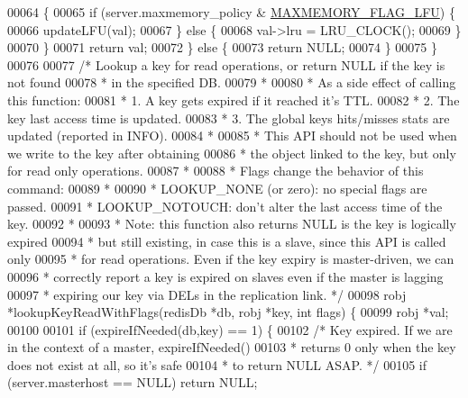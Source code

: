 \begin{DoxyCode}
00064         \{
00065             \textcolor{keywordflow}{if} (server.maxmemory\_policy & \hyperlink{server_8h_aac2d3ad7a604f87e06e25233dbd01c9b}{MAXMEMORY\_FLAG\_LFU}) \{
00066                 updateLFU(val);
00067             \} \textcolor{keywordflow}{else} \{
00068                 val->lru = LRU\_CLOCK();
00069             \}
00070         \}
00071         \textcolor{keywordflow}{return} val;
00072     \} \textcolor{keywordflow}{else} \{
00073         \textcolor{keywordflow}{return} NULL;
00074     \}
00075 \}
00076 
00077 \textcolor{comment}{/* Lookup a key for read operations, or return NULL if the key is not found}
00078 \textcolor{comment}{ * in the specified DB.}
00079 \textcolor{comment}{ *}
00080 \textcolor{comment}{ * As a side effect of calling this function:}
00081 \textcolor{comment}{ * 1. A key gets expired if it reached it's TTL.}
00082 \textcolor{comment}{ * 2. The key last access time is updated.}
00083 \textcolor{comment}{ * 3. The global keys hits/misses stats are updated (reported in INFO).}
00084 \textcolor{comment}{ *}
00085 \textcolor{comment}{ * This API should not be used when we write to the key after obtaining}
00086 \textcolor{comment}{ * the object linked to the key, but only for read only operations.}
00087 \textcolor{comment}{ *}
00088 \textcolor{comment}{ * Flags change the behavior of this command:}
00089 \textcolor{comment}{ *}
00090 \textcolor{comment}{ *  LOOKUP\_NONE (or zero): no special flags are passed.}
00091 \textcolor{comment}{ *  LOOKUP\_NOTOUCH: don't alter the last access time of the key.}
00092 \textcolor{comment}{ *}
00093 \textcolor{comment}{ * Note: this function also returns NULL is the key is logically expired}
00094 \textcolor{comment}{ * but still existing, in case this is a slave, since this API is called only}
00095 \textcolor{comment}{ * for read operations. Even if the key expiry is master-driven, we can}
00096 \textcolor{comment}{ * correctly report a key is expired on slaves even if the master is lagging}
00097 \textcolor{comment}{ * expiring our key via DELs in the replication link. */}
00098 robj *lookupKeyReadWithFlags(redisDb *db, robj *key, \textcolor{keywordtype}{int} flags) \{
00099     robj *val;
00100 
00101     \textcolor{keywordflow}{if} (expireIfNeeded(db,key) == 1) \{
00102         \textcolor{comment}{/* Key expired. If we are in the context of a master, expireIfNeeded()}
00103 \textcolor{comment}{         * returns 0 only when the key does not exist at all, so it's safe}
00104 \textcolor{comment}{         * to return NULL ASAP. */}
00105         \textcolor{keywordflow}{if} (server.masterhost == NULL) \textcolor{keywordflow}{return} NULL;

\end{DoxyCode}
